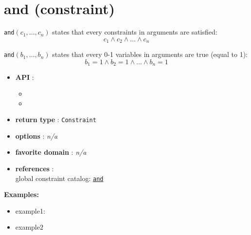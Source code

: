 \label{and}
\hypertarget{and}{}

\section{and (constraint)}\label{and:andconstraint}\hypertarget{and:andconstraint}{}
\begin{notedef}
  \texttt{and}$(c_1,\ldots,c_n)$ states that every constraints in arguments are satisfied:
$$ c_1 \land c_2 \land\ldots\land c_n$$

  \texttt{and}$(b_1,\ldots,b_n)$ states that every 0-1 variables in arguments are true (equal to 1):
$$ b_1=1 \land b_2=1 \land\ldots\land b_n=1$$
\end{notedef}

\begin{itemize}
\item \textbf{API} : 
\begin{itemize}
\item {}
\item {}
\end{itemize}
\item \textbf{return type} : \texttt{Constraint}
\item \textbf{options} : \emph{n/a}
\item \textbf{favorite domain} : \emph{n/a}
\item \textbf{references} :\\
  global constraint catalog: \href{http://www.emn.fr/x-info/sdemasse/gccat/Cand.html}{\tt and}
\end{itemize}

\textbf{Examples:}
\begin{itemize}
	\item example1:
\end{itemize}

\begin{itemize}
	\item example2
\end{itemize}



